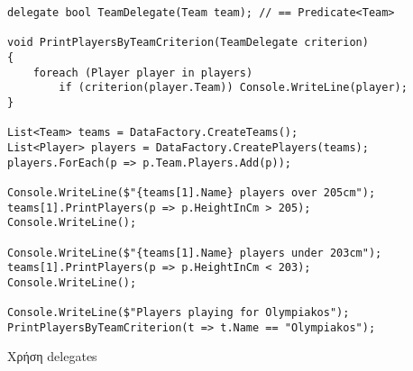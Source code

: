 \begin{listing}[htbp]
\begin{verbatim}
delegate bool TeamDelegate(Team team); // == Predicate<Team>

void PrintPlayersByTeamCriterion(TeamDelegate criterion)
{
    foreach (Player player in players)
        if (criterion(player.Team)) Console.WriteLine(player);
}

List<Team> teams = DataFactory.CreateTeams();
List<Player> players = DataFactory.CreatePlayers(teams);
players.ForEach(p => p.Team.Players.Add(p));

Console.WriteLine($"{teams[1].Name} players over 205cm");
teams[1].PrintPlayers(p => p.HeightInCm > 205);
Console.WriteLine();

Console.WriteLine($"{teams[1].Name} players under 203cm");
teams[1].PrintPlayers(p => p.HeightInCm < 203);
Console.WriteLine();

Console.WriteLine($"Players playing for Olympiakos");
PrintPlayersByTeamCriterion(t => t.Name == "Olympiakos");
\end{verbatim}
\caption{Χρήση delegates}
\label{funcDelegExec}
\end{listing}